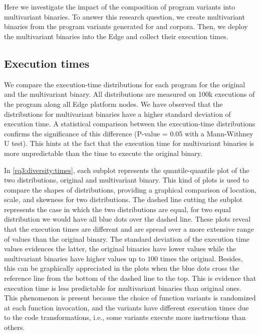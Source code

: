 \section{\rqthree}
\label{results:rq3}

Here we investigate the impact of the composition of program variants into multivariant binaries.
To answer this research question, we create multivariant binaries from the program variants generated for \corpussodium and \corpusqrcode corpora. Then, we deploy the multivariant binaries into the Edge and collect their execution times. 

\subsection{Execution times}


We compare the execution-time distributions for each program for the original and the multivariant binary. All distributions are measured on 100k executions of the program along all Edge platform nodes.
We have observed that the distributions for multivariant binaries have a higher standard deviation of execution time.
A statistical comparison between the execution-time distributions confirms the significance of this difference (P-value = 0.05 with a  Mann-Withney U test). This hints at the fact that the execution time for multivariant binaries is more unpredictable than the time to execute the original binary. 


In \autoref{rq3:diversity:times}, each subplot represents the quantile-quantile plot \cite{gnanadesikan1968probability} of the two distributions, original and multivariant binary.
This kind of plots is used to compare the shapes of distributions, providing a graphical comparison of location, scale, and skewness for two distributions.
The dashed line cutting the subplot represents the case in which the two distributions are equal, \ie for two equal distribution we would have all blue dots over the dashed line. These plots reveal that the execution times are different and are spread over a more extensive range of values than the original binary.
The standard deviation of the execution time values evidences the latter, the original binaries have lower values while the multivariant binaries have higher values up to $100$ times the original. Besides, this can be graphically appreciated in the plots when the blue dots cross the reference line from the bottom of the dashed line to the top.
This is evidence that execution time is less predictable for multivariant binaries than original ones.
This phenomenon is present because the choice of function variants is randomized at each function invocation, and the variants have different execution times due to the code transformations, i.e., some variants execute more instructions than others. 
 

